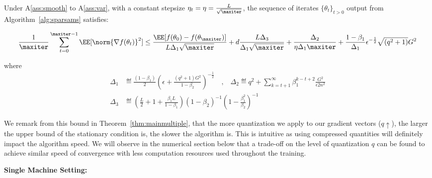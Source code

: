 \documentclass[11pt]{article}
\begin{document}
\begin{Theorem}\label{thm:mainmultiple}
Under A\ref{ass:smooth} to A\ref{ass:var}, with a constant stepsize $\eta_t = \eta = \frac{L}{\sqrt{\maxiter}}$, the sequence of iterates $\{\theta_t\}_{t>0}$ output from Algorithm~\ref{alg:sparsams} satisfies:

\begin{equation}
\begin{split}
 \frac{1}{\maxiter}\sum_{t=0}^{\maxiter -1} \EE[\norm{\nabla f(\theta_t)}^2] \leq \frac{\EE[ f(\theta_{0}) - f(\theta_{\maxiter})]}{L \Delta_1 \sqrt{\maxiter}} + 
d\frac{L \Delta_3}{\Delta_1 \sqrt{\maxiter}}  + \frac{\Delta_2}{\eta \Delta_1\maxiter} +\frac{1-\beta_1}{\Delta_1}  \epsilon^{-\frac{1}{2}} \sqrt{(q^2+1)}G^2 
\end{split}
\end{equation}


where 
\begin{equation}
\begin{split}
\Delta_1 & \eqdef \frac{(1-\beta_1)}{2} (\epsilon + \frac{(q^2+1)G^2}{1 - \beta_2})^{-\frac{1}{2}} \quad \textrm{,} \quad \Delta_2 \eqdef q^2 + \sum_{k=t+1}^\infty  \beta_1^{k-t+2}\frac{G^2 }{\epsilon 2n^2}\\
\Delta_3 &\eqdef \left(\frac{L}{2} + 1+ \frac{\beta_1L}{1-\beta_1} \right) (1-\beta_2)^{-1} (1 - \frac{\beta_1^{2}}{\beta_2})^{-1}
\end{split}
\end{equation}
\end{Theorem}

We remark from this bound in Theorem~\ref{thm:mainmultiple}, that the more quantization we apply to our gradient vectors ($q \uparrow$), the larger the upper bound of the stationary condition is, \ie the slower the algorithm is. 
This is intuitive as using compressed quantities will definitely impact the algorithm speed.
We will observe in the numerical section below that a trade-off on the level of quantization $q$ can be found to achieve similar speed of convergence with less computation resources used throughout the training.





\textbf{Single Machine Setting:}
\end{document}
